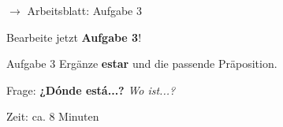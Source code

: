 \documentclass[aspectratio=169, 11pt]{beamer}
\newcommand{\de}[1]{{\small\textcolor{dunkelgrau}{\textit{#1}}}}
\newcommand{\estar}[1]{\textbf{\textcolor{blau}{#1}}}
\begin{document}
\begin{frame}{$\rightarrow$ Arbeitsblatt: Aufgabe 3}

\begin{center}
{\Large Bearbeite jetzt \textbf{Aufgabe 3}!}
\end{center}

\vspace{0.8cm}

\begin{block}{Aufgabe 3}
Ergänze \estar{estar} und die passende Präposition.
\end{block}

\vspace{0.5cm}

\begin{center}
{\large Frage: \estar{¿Dónde está...?} \de{Wo ist...?}}
\end{center}

\vspace{0.5cm}

\begin{center}
{\small\textcolor{dunkelgrau}{Zeit: ca. 8 Minuten}}
\end{center}

\end{frame}
\end{document}
